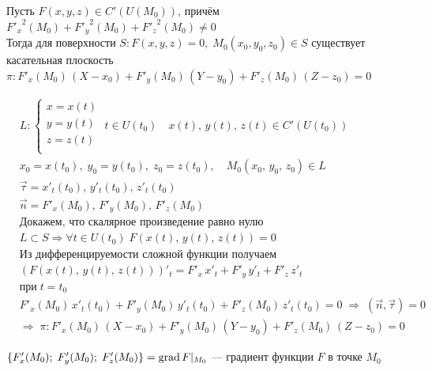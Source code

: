 		\begin{Th}
			Пусть $F(x, y, z) \in C'(U(M_0))$, причём ${F'_x}^2(M_0) + {F'_y}^2(M_0) + {F'_z}^2(M_0) \neq 0$ \\
			Тогда для поверхности $S : F(x, y, z) = 0, \; M_0(x_0, y_0, z_0) \in S$ существует касательная плоскость $\pi : F'_x(M_0)\,(X-x_0) + F'_y(M_0)\,(Y-y_0) + F'_z(M_0)\,(Z-z_0) = 0$
		\end{Th}
		\begin{Proof}
			\begin{align*}
			&L:\begin{cases}
					x = x(t)\\
					y = y(t)\\
					z = z(t)\\	
			   \end{cases} \; t \in U(t_0) \quad x(t),\, y(t),\, z(t) \in C'(U(t_0))\\
			&x_0 = x(t_0), \; y_0 = y(t_0), \; z_0 = z(t_0), \quad M_0(x_0,\, y_0,\, z_0) \in L\\
			&\vec{\tau} = {x'_t(t_0),\, y'_t(t_0),\, z'_t(t_0)}\\
			&\vec{n} = {F'_x(M_0),\, F'_y(M_0),\, F'_z(M_0)}\\
			&\text{Докажем, что скалярное произведение равно нулю}\\
			&L \subset S \Rightarrow \forall t \in U(t_0) \; F(x(t),\, y(t),\, z(t)) = 0\\
			&\text{Из дифференцируемости сложной функции получаем}\\
			&(F(x(t),\, y(t),\, z(t)))'_t = F'_x\, x'_t + F'_y\, y'_t + F'_z\, z'_t\\ &\text{при} \; t = t_0\\
			&F'_x(M_0)\,x'_t(t_0) + F'_y(M_0)\,y'_t(t_0) + F'_z(M_0)\,z'_t(t_0) = 0 \; \Rightarrow \; (\vec{n}, \vec{\tau}) = 0\\
			&\Rightarrow \; \pi : F'_x(M_0)\,(X-x_0) + F'_y(M_0)\,(Y-y_0) + F'_z(M_0)\,(Z-z_0) = 0
			\end{align*}
		\end{Proof}
		
		\begin{Def}[Градиент]
			$\{F'_x(M_0);\; F'_y(M_0);\; F'_z(M_0)\} = \mathop{\mathrm{grad}} F |_{M_0}$ --- градиент функции $F$ в точке $M_0$
		\end{Def}
	
